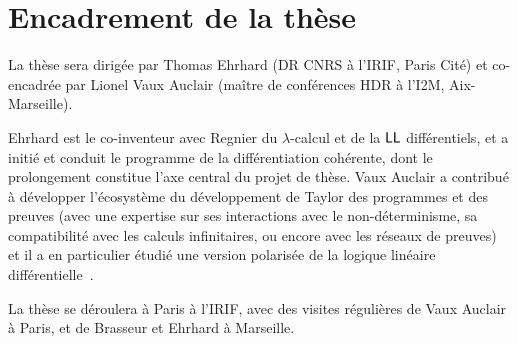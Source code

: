 \documentclass[a4]{article}
\begin{document}
\section{Encadrement de la thèse}

La thèse sera dirigée par Thomas Ehrhard (DR CNRS à l’IRIF, Paris
Cité) et co-encadrée par Lionel Vaux Auclair (maître de conférences HDR à
l’I2M, Aix-Marseille).

Ehrhard est le co-inventeur avec Regnier du $\lambda$-calcul et de la $\hbox{\textsf{LL}}$
différentiels, et a initié et conduit le programme de la différentiation
cohérente, dont le prolongement constitue l’axe central du projet de thèse.
Vaux Auclair a contribué à développer l’écosystème du développement de Taylor
des programmes et des preuves (avec une expertise sur ses interactions avec le
non-déterminisme, sa compatibilité avec les calculs infinitaires, 
ou encore avec les réseaux de preuves) et il a en particulier étudié une
version polarisée de la logique linéaire diffé\-ren\-tielle~\cite{Vaux09a}.

La thèse se déroulera à Paris à l’IRIF, avec des visites régulières de Vaux
Auclair à Paris, et de Brasseur et Ehrhard à Marseille.



\end{document}

